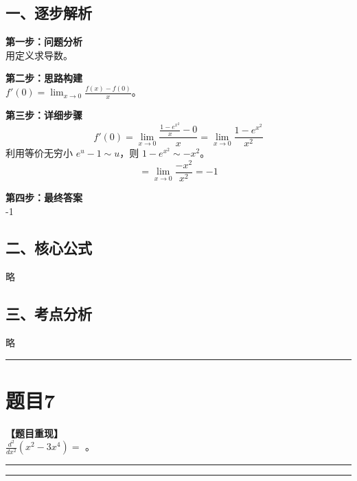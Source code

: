 \documentclass[12pt, a4paper]{ctexart}
\newcommand{\TopSeparator}{
    \par\noindent\rule{\textwidth}{1.5pt}\vspace{0.5em} %
}
\newcommand{\AnalysisSeparator}{
    \par\noindent\rule{\textwidth}{0.5pt}\vspace{0.2em}\hrule\vspace{0.5em} %
}
\newenvironment{RedAnalysis}{
    \par
    \color{red} %
}{
    \par
    \color{black} %
}
\begin{document}
\begin{RedAnalysis}

\subsection*{一、逐步解析}

\textbf{第一步：问题分析} \\
用定义求导数。

\textbf{第二步：思路构建} \\
$f'(0) = \lim_{x\to 0} \frac{f(x)-f(0)}{x}$。

\textbf{第三步：详细步骤} \\
\[ f'(0) = \lim_{x\to 0} \frac{\frac{1-e^{x^2}}{x} - 0}{x} = \lim_{x\to 0} \frac{1-e^{x^2}}{x^2} \]
利用等价无穷小 $e^u - 1 \sim u$，则 $1 - e^{x^2} \sim -x^2$。
\[ = \lim_{x\to 0} \frac{-x^2}{x^2} = -1 \]

\textbf{第四步：最终答案} \\
-1

\subsection*{二、核心公式}
略

\subsection*{三、考点分析}
略

\end{RedAnalysis}

\vspace{2em}

\TopSeparator
\section*{题目7}

\textbf{【题目重现】} \\
$ \frac{d^2}{dx^{2}}(x^{2}-3x^{4})= $ \underline{\hspace{2cm}}。

\AnalysisSeparator
\end{document}
